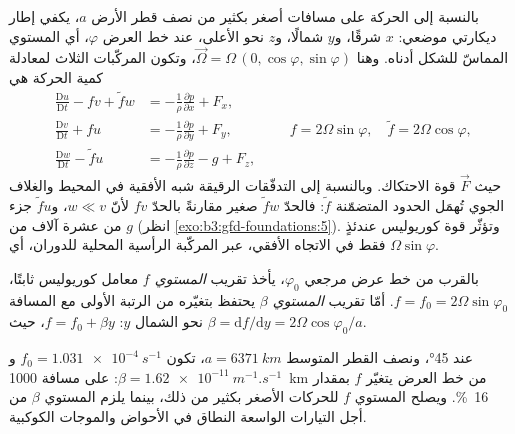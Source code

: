 بالنسبة إلى الحركة على مسافات أصغر بكثير من نصف قطر الأرض $a$، يكفي
إطار ديكارتي موضعي: $x$ شرقًا، و$y$ شمالًا، و$z$ نحو الأعلى،
عند خط العرض $\varphi$، أي المستوي المماسّ للشكل أدناه. وهنا
$\vec\Omega = \Omega\,(0, \cos\varphi, \sin\varphi)$، وتكون المركّبات الثلاث
لمعادلة كمية الحركة هي
\[
\begin{aligned}
\frac{\mathrm Du}{\mathrm Dt} - f v + \tilde f w &= -\frac{1}{\rho}\frac{\partial p}{\partial x} + F_x ,\\
\frac{\mathrm Dv}{\mathrm Dt} + f u &= -\frac{1}{\rho}\frac{\partial p}{\partial y} + F_y ,\\
\frac{\mathrm Dw}{\mathrm Dt} - \tilde f u &= -\frac{1}{\rho}\frac{\partial p}{\partial z} - g + F_z ,
\end{aligned}
\qquad f = 2\Omega\sin\varphi,\quad \tilde f = 2\Omega\cos\varphi ,
\]
حيث $\vec F$ قوة الاحتكاك. وبالنسبة إلى التدفّقات الرقيقة شبه الأفقية في
المحيط والغلاف الجوي تُهمَل الحدود المتضمّنة $\tilde f$: فالحدّ $\tilde f w$
صغير مقارنةً بالحدّ $fv$ لأنّ $w \ll v$، و$\tilde f u$ جزء من عشرة آلاف من
$g$ (انظر \cref{exo:b3:gfd-foundations:5}). وتؤثّر قوة كوريوليس عندئذٍ فقط في الاتجاه الأفقي،
عبر المركّبة الرأسية المحلية للدوران، أي
$\Omega\sin\varphi$.

\begin{definition}\label{def:b3:gfd-foundations:planes}
بالقرب من خط عرض مرجعي $\varphi_0$، يأخذ تقريب \emph{المستوي $f$}
معامل كوريوليس ثابتًا، $f = f_0 =
2\Omega\sin\varphi_0$. أمّا تقريب \emph{المستوي $\beta$}
يحتفظ بتغيّره من الرتبة الأولى مع المسافة نحو الشمال $y$:
$f = f_0 + \beta y$، حيث $\beta = \mathrm df/\mathrm dy = 2\Omega
\cos\varphi_0/a$.
\end{definition}

عند \ang{45}، ونصف القطر المتوسط $a = \qty{6371}{km}$، تكون $f_0 =
\qty{1.031e-4}{s^{-1}}$ و$\beta = \qty{1.62e-11}{m^{-1}.s^{-1}}$: على مسافة
\qty{1000}{km} من خط العرض يتغيّر $f$ بمقدار \qty{16}{\percent}. ويصلح المستوي $f$
للحركات الأصغر بكثير من ذلك، بينما يلزم المستوي $\beta$
من أجل التيارات الواسعة النطاق في الأحواض والموجات الكوكبية.

